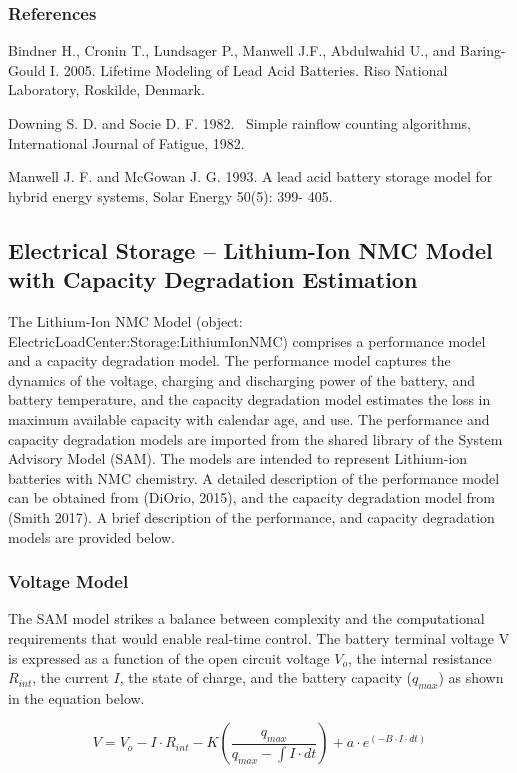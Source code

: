 \subsubsection{References}\label{references-021}

Bindner H., Cronin T., Lundsager P., Manwell J.F., Abdulwahid U., and Baring-Gould I. 2005. Lifetime Modeling of Lead Acid Batteries. Riso National Laboratory, Roskilde, Denmark.

\noindent
Downing S. D. and Socie D. F. 1982.~ Simple rainflow counting algorithms, International Journal of Fatigue, 1982.

\noindent
Manwell J. F. and McGowan J. G. 1993. A lead acid battery storage model for hybrid energy systems, Solar Energy 50(5): 399- 405.

\subsection{Electrical Storage – Lithium-Ion NMC Model with Capacity Degradation Estimation}

The Lithium-Ion NMC Model (object: ElectricLoadCenter:Storage:LithiumIonNMC) comprises a performance model and a capacity degradation model. The performance model captures the dynamics of the voltage, charging and discharging power of the battery, and battery temperature, and the capacity degradation model  estimates the loss in maximum available capacity with calendar age, and use. The performance and capacity degradation models are imported from the shared library of the System Advisory Model (SAM). The models are intended to represent Lithium-ion batteries with NMC chemistry. A detailed description of the performance model can be obtained from (DiOrio, 2015), and the capacity degradation model from (Smith 2017). A brief description of the performance, and capacity degradation models are provided below.

\subsubsection{Voltage Model}
 The SAM model strikes a balance between complexity and the computational requirements that would enable real-time control. The battery terminal voltage V is expressed as a function of the open circuit voltage $V_o$, the internal resistance $R_{int}$, the current $I$, the state of charge, and the battery capacity ($q_{max}$) as shown in the equation below.

\begin{equation}
 V=V_o-I\cdot R_{int}-K \left(\frac{q_{max}}{q_{max}-\int{I\cdot dt}}\right)+a\cdot e^{(-B \cdot I\cdot dt)}
\label{Equation: Voltage}
\end{equation}

